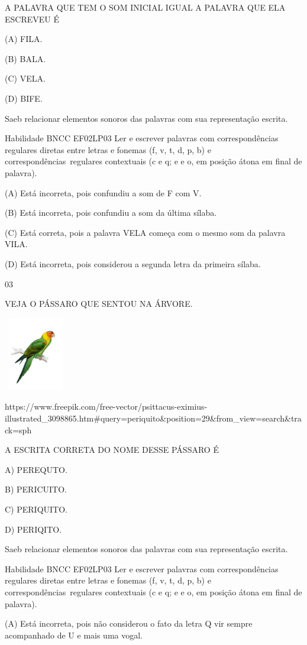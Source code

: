 {{{{{{A PALAVRA QUE TEM O SOM INICIAL IGUAL A PALAVRA QUE ELA ESCREVEU É

(A) FILA.

(B) BALA.

(C) VELA.

(D) BIFE.

Saeb relacionar elementos sonoros das palavras com sua representação
escrita.

Habilidade BNCC EF02LP03 Ler e escrever palavras com correspondências
regulares diretas entre letras e fonemas (f, v, t, d, p, b) e
correspondências~regulares contextuais (c e q; e e o, em posição átona
em final de palavra).

(A) Está incorreta, pois confundiu a som de F com V.

(B) Está incorreta, pois confundiu a som da última sílaba.

(C) Está correta, pois a palavra VELA começa com o mesmo som da palavra
VILA.

(D) Está incorreta, pois considerou a segunda letra da primeira sílaba.

\num{03}

VEJA O PÁSSARO QUE SENTOU NA ÁRVORE.

\includegraphics[width=1.08542in,height=1.27222in]{media/image165.jpeg}

https://www.freepik.com/free-vector/psittacus-eximius-illustrated\_3098865.htm\#query=periquito\&position=29\&from\_view=search\&track=sph

A ESCRITA CORRETA DO NOME DESSE PÁSSARO É

A) PEREQUTO.

B) PERICUITO.

C) PERIQUITO.

D) PERIQITO.

Saeb relacionar elementos sonoros das palavras com sua representação
escrita.

Habilidade BNCC EF02LP03 Ler e escrever palavras com correspondências
regulares diretas entre letras e fonemas (f, v, t, d, p, b) e
correspondências~regulares contextuais (c e q; e e o, em posição átona
em final de palavra).

(A) Está incorreta, pois não considerou o fato da letra Q vir sempre
acompanhado de U e mais uma vogal.

}}}}}}
